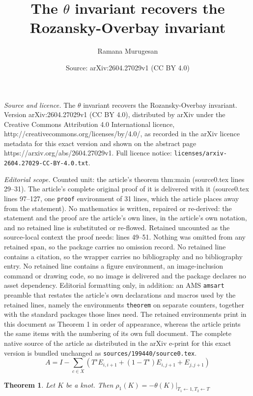 \documentclass[10pt,a4paper]{amsart}
\title{The $\theta$ invariant recovers the Rozansky-Overbay invariant}
\author{Ramana Murugesan}
\date{Source: arXiv:2604.27029v1 (CC BY 4.0)}
\newtheorem{theorem}{Theorem}
\begin{document}
\maketitle

\noindent\emph{Source and licence.} The $\theta$ invariant recovers the Rozansky-Overbay invariant. Version arXiv:2604.27029v1 (CC BY 4.0), distributed by arXiv under the Creative Commons Attribution 4.0 International licence, http://creativecommons.org/licenses/by/4.0/, as recorded in the arXiv licence metadata for this exact version and shown on the abstract page https://arxiv.org/abs/2604.27029v1. Full licence notice: \texttt{licenses/arxiv-2604.27029-CC-BY-4.0.txt}.\par\smallskip

\noindent\textit{Editorial scope.} Counted unit: the article's theorem thm:main (source0.tex lines 29--31). The article's complete original proof of it is delivered with it (source0.tex lines 97--127, one \texttt{proof} environment of 31 lines, which the article places away from the statement). No mathematics is written, repaired or re-derived: the statement and the proof are the article's own lines, in the article's own notation, and no retained line is substituted or re-flowed.  Retained uncounted as the source-local context the proof needs: lines 49--51.  Nothing was omitted from any retained span, so the package carries no omission record.  No retained line contains a citation, so the wrapper carries no bibliography and no bibliography entry.  No retained line contains a figure environment, an image-inclusion command or drawing code, so no image is delivered and the package declares no asset dependency.  Editorial formatting only, in addition: an AMS \texttt{amsart} preamble that restates the article's own declarations and macros used by the retained lines, namely the environments \texttt{theorem} on separate counters, together with the standard packages those lines need.  The retained environments print in this document as Theorem 1 in order of appearance, whereas the article prints the same items with the numbering of its own full document.  The complete native source of the article as distributed in the arXiv e-print for this exact version is bundled unchanged as \texttt{sources/199440/source0.tex}.
\begin{equation}
    A=I-\sum_{c\in X} (T^s E_{i,i+1}+(1-T^s)E_{i,j+1}+E_{j,j+1}) \label{A}
\end{equation}

\begin{theorem}\label{thm:main}
    Let $K$ be a knot. Then $\rho_1(K)=-\theta(K)|_{T_1\leftarrow 1,T_2\leftarrow T}$
\end{theorem}
\end{document}
